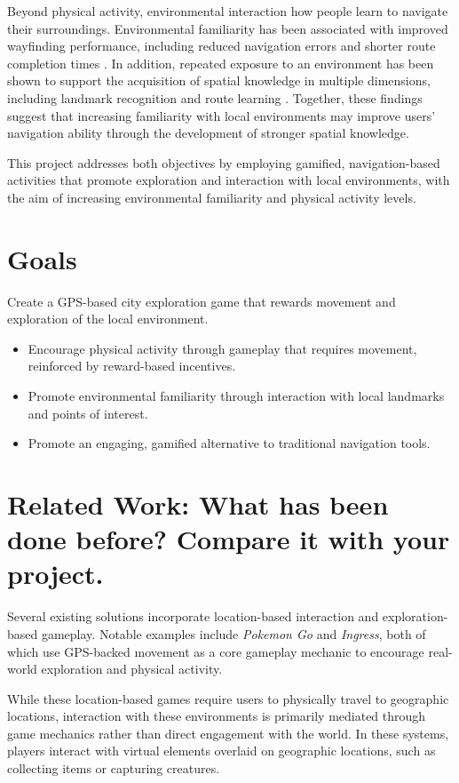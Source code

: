 \documentclass{vgtc}                          %
\begin{document}
Beyond physical activity, environmental interaction how people learn to navigate their surroundings. Environmental familiarity has been associated with improved wayfinding performance, including reduced navigation errors and shorter route completion times \cite{ONEILL1992319}. In addition, repeated exposure to an environment has been shown to support the acquisition of spatial knowledge in multiple dimensions, including landmark recognition and route learning \cite{YING2026103031}. Together, these findings suggest that increasing familiarity with local environments may improve users' navigation ability through the development of stronger spatial knowledge.

This project addresses both objectives by employing gamified, navigation-based activities that promote exploration and interaction with local environments, with the aim of increasing environmental familiarity and physical activity levels.


\section{Goals}

Create a GPS-based city exploration game that rewards movement and exploration of the local environment.

\begin{itemize}
    \item Encourage physical activity through gameplay that requires movement, reinforced by reward-based incentives.
    \item Promote environmental familiarity through interaction with local landmarks and points of interest.
    \item Promote an engaging, gamified alternative to traditional navigation tools.
\end{itemize}


\section{Related Work: What has been done before? Compare it with your project.}

Several existing solutions incorporate location-based interaction and exploration-based gameplay. Notable examples include \textit{Pokemon Go} and \textit{Ingress}, both of which use GPS-backed movement as a core gameplay mechanic to encourage real-world exploration and physical activity.  

While these location-based games require users to physically travel to geographic locations, interaction with these environments is primarily mediated through game mechanics rather than direct engagement with the world. In these systems, players interact with virtual elements overlaid on geographic locations, such as collecting items or capturing creatures.
\end{document}
